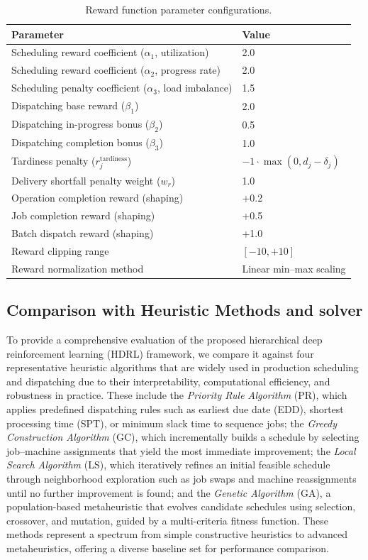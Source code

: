 \documentclass{article}
\begin{document}
\begin{table}[H]
\centering
\caption{Reward function parameter configurations.}
\label{tab:reward-parameters}
\begin{tabular}{p{7.5cm} p{4cm}}
\toprule
\textbf{Parameter} & \textbf{Value} \\
\midrule
Scheduling reward coefficient ($\alpha_1$, utilization) & 2.0 \\
Scheduling reward coefficient ($\alpha_2$, progress rate) & 2.0 \\
Scheduling penalty coefficient ($\alpha_3$, load imbalance) & 1.5 \\
\addlinespace
Dispatching base reward ($\beta_1$) & 2.0 \\
Dispatching in-progress bonus ($\beta_2$) & 0.5 \\
Dispatching completion bonus ($\beta_3$) & 1.0 \\
Tardiness penalty ($r_j^{\text{tardiness}}$) & $-1 \cdot \max(0, d_j - \delta_j)$ \\
Delivery shortfall penalty weight ($w_r$) & 1.0 \\
\addlinespace
Operation completion reward (shaping) & +0.2 \\
Job completion reward (shaping) & +0.5 \\
Batch dispatch reward (shaping) & +1.0 \\
\addlinespace
Reward clipping range & $[-10, +10]$ \\
Reward normalization method & Linear min–max scaling \\
\bottomrule
\end{tabular}
\end{table}

\subsection{Comparison with Heuristic Methods and solver}

To provide a comprehensive evaluation of the proposed hierarchical deep reinforcement learning (HDRL) framework, we compare it against four representative heuristic algorithms that are widely used in production scheduling and dispatching due to their interpretability, computational efficiency, and robustness in practice. These include the \emph{Priority Rule Algorithm} (PR), which applies predefined dispatching rules such as earliest due date (EDD), shortest processing time (SPT), or minimum slack time to sequence jobs; the \emph{Greedy Construction Algorithm} (GC), which incrementally builds a schedule by selecting job–machine assignments that yield the most immediate improvement; the \emph{Local Search Algorithm} (LS), which iteratively refines an initial feasible schedule through neighborhood exploration such as job swaps and machine reassignments until no further improvement is found; and the \emph{Genetic Algorithm} (GA), a population-based metaheuristic that evolves candidate schedules using selection, crossover, and mutation, guided by a multi-criteria fitness function. These methods represent a spectrum from simple constructive heuristics to advanced metaheuristics, offering a diverse baseline set for performance comparison.
\end{document}
